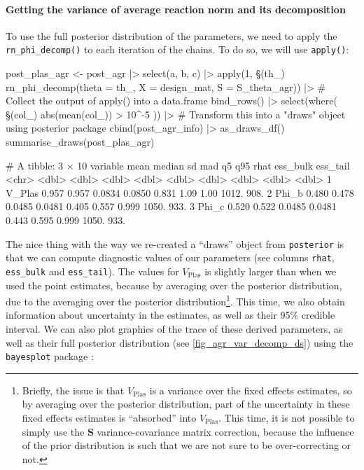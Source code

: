 \documentclass[a4paper,12pt,twoside]{article}
\begin{document}
\paragraph{Getting the variance of average reaction norm and its decomposition}
To use the full posterior distribution of the parameters, we need to apply the \texttt{rn\_phi\_decomp()} to each iteration of the chains. To do so, we will use \texttt{apply()}:
\begin{Rinput}
post_plas_agr <-
    post_agr |>
    select(a, b, c) |>
    apply(1, \§§(th_) rn_phi_decomp(theta = th_, X = design_mat, S = S_theta_agr)) |>
    # Collect the output of apply() into a data.frame
    bind_rows()  |>
    select(where( \§§(col_) { abs(mean(col_)) > 10^-5 })) |>
    # Transform this into a "draws" object using posterior package
    cbind(post_agr_info) |>
    as_draws_df()
summarise_draws(post_plas_agr)
\end{Rinput}
\begin{Routput}
# A tibble: 3 × 10
  variable  mean median     sd    mad    q5   q95  rhat ess_bulk ess_tail
  <chr>    <dbl>  <dbl>  <dbl>  <dbl> <dbl> <dbl> <dbl>    <dbl>    <dbl>
1 V_Plas   0.957  0.957 0.0834 0.0850 0.831 1.09  1.00     1012.     908.
2 Phi_b    0.480  0.478 0.0485 0.0481 0.405 0.557 0.999    1050.     933.
3 Phi_c    0.520  0.522 0.0485 0.0481 0.443 0.595 0.999    1050.     933.
\end{Routput}
The nice thing with the way we re-created a ``draws'' object from \texttt{posterior} is that we can compute diagnostic values of our parameters (see columns \texttt{rhat}, \texttt{ess\_bulk} and \texttt{ess\_tail}).
The values for $V_{\text{Plas}}$ is slightly larger than when we used the point estimates, because by averaging over the posterior distribution, due to the averaging over the posterior distribution\footnote{Briefly, the issue is that $V_{\text{Plas}}$ is a variance over the fixed effects estimates, so by averaging over the posterior distribution, part of the uncertainty in these fixed effects estimates is ``absorbed'' into $V_{\text{Plas}}$. This time, it is not possible to simply use the $\mathbf{S}$ variance-covariance matrix correction, because the influence of the prior distribution is such that we are not sure to be over-correcting or not.}.
This time, we also obtain information about uncertainty in the estimates, as well as their 95\% credible interval.
We can also plot graphics of the trace of these derived parameters, as well as their full posterior distribution (see \autoref{fig_agr_var_decomp_ds}) using the \texttt{bayesplot} package :
\end{document}

